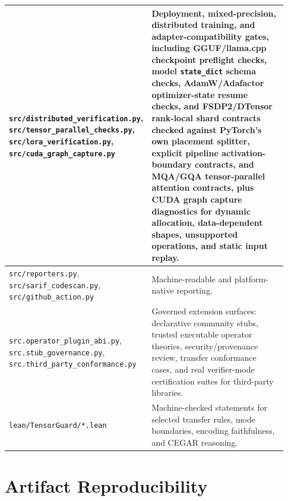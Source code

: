 \documentclass[11pt]{article}
\begin{document}
\begin{longtable}{|p{0.24\linewidth}|p{0.69\linewidth}|}
\texttt{src/distributed\_verification.py}, \texttt{src/tensor\_parallel\_checks.py},
\texttt{src/lora\_verification.py}, \texttt{src/cuda\_graph\_capture.py} &
Deployment, mixed-precision, distributed training, and adapter-compatibility
gates, including GGUF/llama.cpp checkpoint preflight checks, model
\texttt{state\_dict} schema checks, AdamW/Adafactor optimizer-state resume
checks, and FSDP2/DTensor
rank-local shard contracts checked against PyTorch's own placement splitter,
explicit pipeline activation-boundary contracts, and MQA/GQA tensor-parallel
attention contracts, plus CUDA graph capture diagnostics for dynamic allocation,
data-dependent shapes, unsupported operations, and static input replay. \\
\hline
\texttt{src/reporters.py}, \texttt{src/sarif\_codescan.py},
\texttt{src/github\_action.py} &
Machine-readable and platform-native reporting. \\
\hline
\texttt{src.operator\_plugin\_abi.py}, \texttt{src.stub\_governance.py},
\texttt{src.third\_party\_conformance.py} &
Governed extension surfaces: declarative community stubs, trusted executable
operator theories, security/provenance review, transfer conformance cases, and
real verifier-mode certification suites for third-party libraries. \\
\hline
\texttt{lean/TensorGuard/*.lean} &
Machine-checked statements for selected transfer rules, mode boundaries,
encoding faithfulness, and CEGAR reasoning. \\
\hline
\end{longtable}

\section{Artifact Reproducibility}
\end{document}

